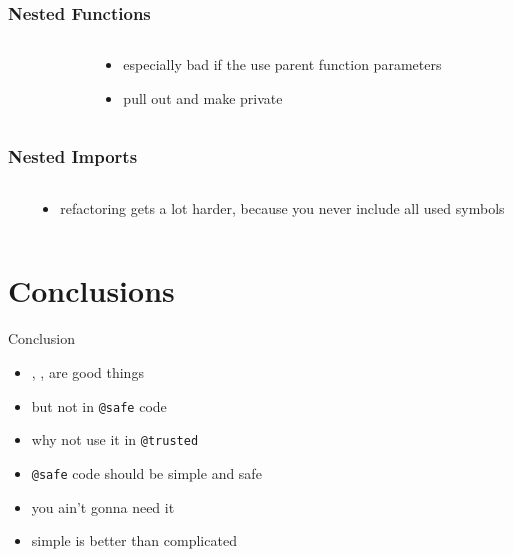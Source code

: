 \documentclass[aspectratio=169,notes]{beamer}
\begin{document}
	\begin{frame}[t]
		\frametitle{Nested Functions}
		\begin{columns}[T]
		\begin{column}{0.49\textwidth}
		
		\end{column}
		\begin{column}{0.49\textwidth}
		\pause
		\begin{itemize}
			\item especially bad if the use parent function parameters
			\item pull out and make private
		\end{itemize}
		\end{column}
		\end{columns}
			
	\end{frame}

	\begin{frame}[t]
		\frametitle{Nested Imports}
		\begin{columns}[T]
		\begin{column}{0.49\textwidth}
		
		\end{column}
		\begin{column}{0.49\textwidth}
		\pause
		\begin{itemize}
			\item refactoring gets a lot harder, because you never include all
				used symbols
		\end{itemize}
		\end{column}
		\end{columns}
	\end{frame}

	\section{Conclusions}
	\begin{frame}[fragile]{Conclusion}
		\begin{itemize}
		\item \lstinline@scope@, \lstinline@ref@, \lstinline@return@ are good things
		\pause
		\item but not in \lstinline|@safe| code
		\pause
		\item why not use it in \lstinline|@trusted|
		\pause
		\item \lstinline|@safe| code should be simple and safe
		\pause
		\item you ain't gonna need it
		\pause
		\item simple is better than complicated
		\end{itemize}
	\end{frame}
\end{document}
